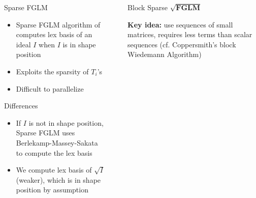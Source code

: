 \documentclass[final]{beamer}
\newlength{\sepwid}
\newlength{\onecolwid}
\newlength{\twocolwid}
\begin{document}
\begin{frame}[t]
\begin{columns}[t]
\begin{column}{\onecolwid}

\begin{alertblock}{Sparse FGLM}
	\begin{itemize}
	\item Sparse FGLM algorithm of \cite{FaMo17} computes lex basis of an ideal $I$ when $I$ is in shape position
	\item Exploits the sparsity of $T_i$'s
	\item Difficult to parallelize
	\end{itemize}
\end{alertblock}

\begin{alertblock}{Differences}
	\begin{itemize}
		\item If $I$ is not in shape position, Sparse FGLM uses 
		Berlekamp-Massey-Sakata to compute the lex basis
		\item We compute lex basis of $\sqrt{I}$ (weaker), which is in shape position by 
		assumption
	\end{itemize}
\end{alertblock}
	



\end{column} %

\begin{column}{\sepwid}\end{column} %

\begin{column}{\twocolwid} %

\begin{block}{Block Sparse $\mathbf{\sqrt{FGLM}}$}

\textbf{Key idea:}  use sequences of small matrices, requires less terms than scalar sequences
(cf. Coppersmith's block Wiedemann Algorithm)

\vspace{1em}

	

\end{block}
\end{column}
\end{columns}
\end{frame}
\end{document}
